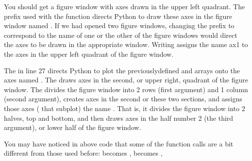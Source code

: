 \documentclass[letterpaper,10pt,english]{sphinxmanual}
\begin{document}
\begin{sphinxVerbatim}[commandchars=\\\{\},numbers=left,firstnumber=1,stepnumber=1]
   
   

  
  

\end{sphinxVerbatim}

\sphinxAtStartPar
You should get a figure window with axes drawn in the upper left quadrant.  The  prefix used with the  function directs Python to draw these axes in the figure window named .  If we had opened two figure windows, changing the prefix to correspond to the name of one or the other of the figure windows would direct the axes to be drawn in the appropriate window.  Writing  assigns the name ax1 to the axes in the upper left quadrant of the figure window.

\sphinxAtStartPar
The  in line 27 directs Python to plot the previously\sphinxhyphen{}defined  and  arrays onto the axes named . The  draws axes in the second, or upper right, quadrant of the figure window. The  divides the figure window into 2 rows (first argument) and 1 column (second argument), creates axes in the second or these two sections, and assigns those axes ( that subplot) the name .  That is, it divides the figure window into 2 halves, top and bottom, and then draws axes in the half number 2 (the third argument), or lower half of the figure window.

\sphinxAtStartPar
You may have noticed in above code that some of the function calls are a bit different from those used before:  becomes ,  becomes , 
\end{document}
